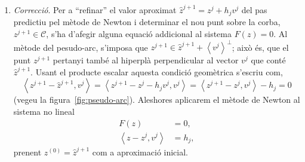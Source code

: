 \documentclass[11pt,reqno,twoside]{article}
\theoremstyle{remark}
\begin{document}
\begin{enumerate}[label = \emph{\arabic*.}]
       \item\emph{Correcció}. Per a ``refinar'' el valor aproximat
	 $\hat{z}^{j+1} = z^{j}+h_{j}v^{j}$ del pas predictiu pel mètode de
	 Newton i determinar el nou punt sobre la corba,
	 $z^{j+1}\in\mathcal{C}$, s'ha d'afegir alguna equació addicional
	 al sistema $F(z) = 0$. Al mètode del pesudo-arc, s'imposa que
	 $z^{j+1}\in\hat{z}^{j+1}+ \left\langle
	 v^{j}\right\rangle^{\perp}$; això és, que el punt $z^{j+1}$
	 pertanyi també al hiperplà perpendicular al vector $v^{j}$ que
	 conté $\hat{z}^{j+1}$. Usant el producte escalar aquesta condició
	 geomètrica s'escriu com, 
     \begin{displaymath}
       \left\langle z^{j+1} - \hat{z}^{j+1}, v^{j}\right\rangle =
       \left\langle z^{j+1} - z^{j} - h_{j} v^{j}, v^{j}\right\rangle =
       \left\langle z^{j+1} - z^{j}, v^{j}\right\rangle - h_{j} = 0
     \end{displaymath}
     (vegeu la figura~\ref{fig:pseudo-arc}). Aleshores aplicarem el mètode de
     Newton al sistema no lineal 
     \begin{align*}
       F(z) &=0,\\
       \left\langle z - z^{j}, v^{j}\right\rangle &= h_{j},
     \end{align*}
     prenent $z^{(0)} =\hat{z}^{j+1}$ com a aproximació inicial.
\end{enumerate}



\end{document}
